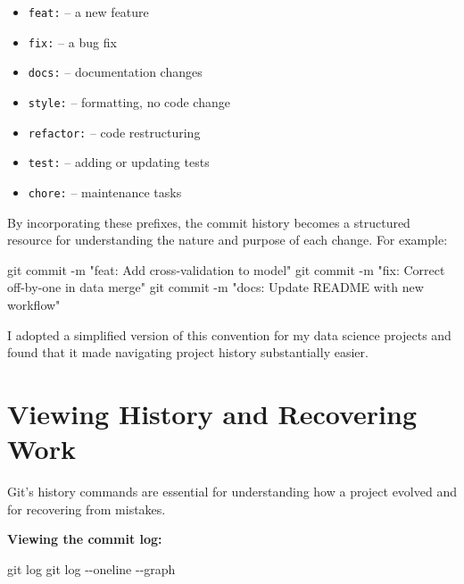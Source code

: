 \documentclass[
  letterpaper,
  DIV=11,
  numbers=noendperiod]{scrartcl}
\newenvironment{Shaded}{\begin{snugshade}}{\end{snugshade}}
\newcommand{\AttributeTok}[1]{\textcolor[rgb]{0.40,0.45,0.13}{#1}}
\newcommand{\FunctionTok}[1]{\textcolor[rgb]{0.28,0.35,0.67}{#1}}
\newcommand{\NormalTok}[1]{\textcolor[rgb]{0.00,0.23,0.31}{#1}}
\newcommand{\StringTok}[1]{\textcolor[rgb]{0.13,0.47,0.30}{#1}}
\providecommand{\tightlist}{%
  \setlength{\itemsep}{0pt}\setlength{\parskip}{0pt}}
\begin{document}
\begin{itemize}
\tightlist
\item
  \texttt{feat:} -- a new feature
\item
  \texttt{fix:} -- a bug fix
\item
  \texttt{docs:} -- documentation changes
\item
  \texttt{style:} -- formatting, no code change
\item
  \texttt{refactor:} -- code restructuring
\item
  \texttt{test:} -- adding or updating tests
\item
  \texttt{chore:} -- maintenance tasks
\end{itemize}

By incorporating these prefixes, the commit history becomes a structured
resource for understanding the nature and purpose of each change. For
example:

\begin{Shaded}
\begin{Highlighting}[]
\FunctionTok{git}\NormalTok{ commit }\AttributeTok{{-}m} \StringTok{"feat: Add cross{-}validation to model"}
\FunctionTok{git}\NormalTok{ commit }\AttributeTok{{-}m} \StringTok{"fix: Correct off{-}by{-}one in data merge"}
\FunctionTok{git}\NormalTok{ commit }\AttributeTok{{-}m} \StringTok{"docs: Update README with new workflow"}
\end{Highlighting}
\end{Shaded}

I adopted a simplified version of this convention for my data science
projects and found that it made navigating project history substantially
easier.

\section{Viewing History and Recovering
Work}\label{viewing-history-and-recovering-work}

Git's history commands are essential for understanding how a project
evolved and for recovering from mistakes.

\textbf{Viewing the commit log:}

\begin{Shaded}
\begin{Highlighting}[]
\FunctionTok{git}\NormalTok{ log}
\FunctionTok{git}\NormalTok{ log }\AttributeTok{{-}{-}oneline} \AttributeTok{{-}{-}graph}
\end{Highlighting}
\end{Shaded}
\end{document}
